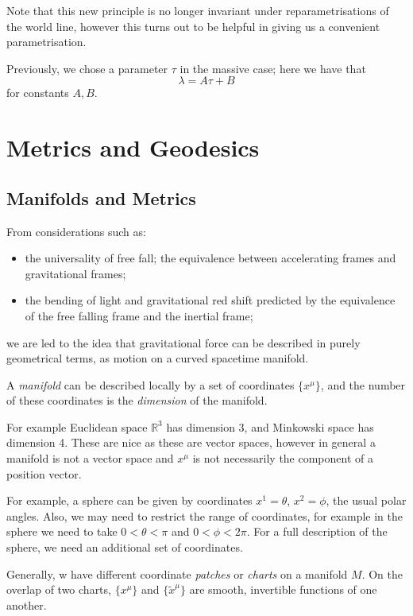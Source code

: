 \documentclass[12pt]{article}
\begin{document}
Note that this new principle is no longer invariant under reparametrisations of the world line, however this turns out to be helpful in giving us a convenient parametrisation.

Previously, we chose a parameter $\tau$ in the massive case; here we have that
\[
\lambda = A \tau + B
\]
for constants $A, B$.

\newpage

\section{Metrics and Geodesics}
\label{sec:met_geo}

\subsection{Manifolds and Metrics}
\label{sub:man_met}

From considerations such as:
\begin{itemize}
	\item the universality of free fall; the equivalence between accelerating frames and gravitational frames;
	\item the bending of light and gravitational red shift predicted by the equivalence of the free falling frame and the inertial frame;
\end{itemize}
we are led to the idea that gravitational force can be described in purely geometrical terms, as motion on a curved spacetime manifold.

A \emph{manifold} can be described locally by a set of coordinates $\{x^\mu\}$, and the number of these coordinates is the \emph{dimension} of the manifold.

For example Euclidean space $\mathbb{R}^3$ has dimension 3, and Minkowski space has dimension 4. These are nice as these are vector spaces, however in general a manifold is not a vector space and $x^\mu$ is not necessarily the component of a position vector.

For example, a sphere can be given by coordinates $x^1 = \theta$, $x^2 = \phi$, the usual polar angles. Also, we may need to restrict the range of coordinates, for example in the sphere we need to take $0 < \theta < \pi$ and $0 < \phi < 2 \pi$. For a full description of the sphere, we need an additional set of coordinates.

Generally, w have different coordinate \emph{patches} or \emph{charts} on a manifold $M$. On the overlap of two charts, $\{x^\mu\}$ and $\{\tilde x^\mu\}$ are smooth, invertible functions of one another.
\end{document}
